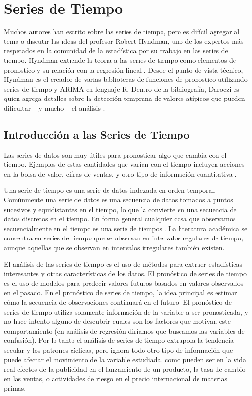 \section{Series de Tiempo}
Muchos autores han escrito sobre las series de tiempo, pero es difícil agregar al tema o discutir las ideas del profesor Robert Hyndman, uno de los expertos más respetados en la comunidad de la estadística por su trabajo en las series de tiempo. Hyndman extiende la teoría a las series de tiempo como elementos de pronostico y su relación con la regresión lineal \cite{hyndman}. Desde el punto de vista técnico, Hyndman es el creador de varias bibliotecas de funciones de pronostico utilizando series de tiempo y ARIMA en lenguaje R. Dentro de la bibliografía, Daroczi es quien agrega detalles sobre la detección temprana de valores atípicos que pueden dificultar – y mucho – el análisis \cite{daroczi}. 

\subsection{Introducción a las Series de Tiempo}
Las series de datos son muy útiles para pronosticar algo que cambia con el tiempo. Ejemplos de estas cantidades que varían con el tiempo incluyen acciones en la bolsa de valor, cifras de ventas, y otro tipo de información cuantitativa \cite{hyndman}.

Una serie de tiempo es una serie de datos indexada en orden temporal. Comúnmente una serie de datos es una secuencia de datos tomados a puntos sucesivos y equidistantes en el tiempo, lo que la convierte en una secuencia de datos discretos en el tiempo. En forma general cualquier cosa que observamos secuencialmente en el tiempo es una serie de tiempos \cite{hyndman}. La literatura académica se concentra en series de tiempo que se observan en intervalos regulares de tiempo, aunque aquellas que se observan en intervalos irregulares también existen. 

El análisis de las series de tiempo es el uso de métodos para extraer estadísticas interesantes y otras características de los datos. El pronóstico de series de tiempo es el uso de modelos para predecir valores futuros basados en valores observados en el pasado. En el pronóstico de series de tiempo, la idea principal es estimar cómo la secuencia de observaciones continuará en el futuro. El pronóstico de series de tiempo utiliza solamente información de la variable a ser pronosticada, y no hace intento alguno de descubrir cuales son los factores que motivan este comportamiento (en análisis de regresión diríamos que buscamos las variables de confusión). Por lo tanto el análisis de series de tiempo extrapola la tendencia secular y los patrones cíclicas, pero ignora todo otro tipo de información que puede afectar el movimiento de la variable estudiada, como pueden ser en la vida real efectos de la publicidad en el lanzamiento de un producto, la tasa de cambio en las ventas, o actividades de riesgo en el precio internacional de materias primas. 

